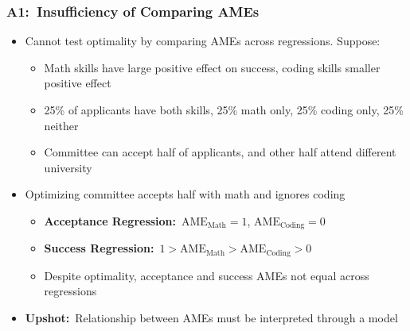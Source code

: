 \documentclass[12pt, aspectratio=169]{beamer}
\begin{document}
\begin{frame}[label=ioca]
\frametitle{A1:\ Insufficiency of Comparing AMEs}
\begin{itemize}
\item Cannot test optimality by comparing AMEs across regressions. Suppose:
\vspace{5pt}
\begin{itemize}
\item Math skills have large positive effect on success, coding skills smaller positive effect
\vspace{5pt}
\item 25\% of applicants have both skills, 25\% math only, 25\% coding only, 25\% neither
\vspace{5pt}
\item Committee can accept half of applicants, and other half attend different university
\vspace{10pt}
\end{itemize}
\item Optimizing committee accepts half with math and ignores coding
\vspace{5pt}
\begin{itemize}
\item \textbf{Acceptance Regression:}\ $\text{AME}_{\text{Math}}=1$, $\text{AME}_{\text{Coding}}=0$
\vspace{5pt}
\item \textbf{Success Regression:}\ $1>\text{AME}_{\text{Math}}>\text{AME}_{\text{Coding}}>0$
\vspace{5pt}
\item Despite optimality, acceptance and success AMEs not equal across regressions
\vspace{10pt}
\end{itemize}
\item \textbf{Upshot:}\ Relationship between AMEs must be interpreted through a model
\vspace{10pt}
\end{itemize}
\hyperlink{avsa}{}
\end{frame}
\end{document}
